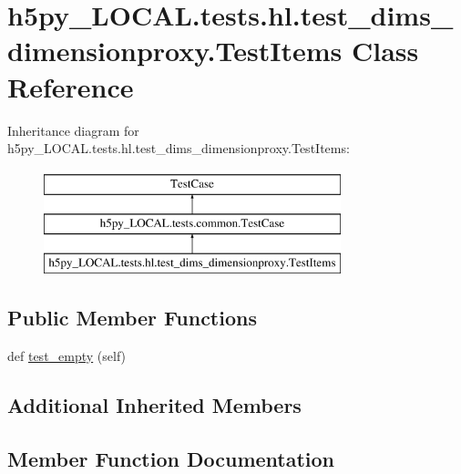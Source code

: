 \hypertarget{classh5py__LOCAL_1_1tests_1_1hl_1_1test__dims__dimensionproxy_1_1TestItems}{}\section{h5py\+\_\+\+L\+O\+C\+A\+L.\+tests.\+hl.\+test\+\_\+dims\+\_\+dimensionproxy.\+Test\+Items Class Reference}
\label{classh5py__LOCAL_1_1tests_1_1hl_1_1test__dims__dimensionproxy_1_1TestItems}
Inheritance diagram for h5py\+\_\+\+L\+O\+C\+A\+L.\+tests.\+hl.\+test\+\_\+dims\+\_\+dimensionproxy.\+Test\+Items\+:\begin{figure}[H]
\begin{center}
\leavevmode
\includegraphics[height=3.000000cm]{classh5py__LOCAL_1_1tests_1_1hl_1_1test__dims__dimensionproxy_1_1TestItems}
\end{center}
\end{figure}
\subsection*{Public Member Functions}
\begin{DoxyCompactItemize}
\item 
def \hyperlink{classh5py__LOCAL_1_1tests_1_1hl_1_1test__dims__dimensionproxy_1_1TestItems_ab36e31dd94cb781d712ef52baca29397}{test\+\_\+empty} (self)
\end{DoxyCompactItemize}
\subsection*{Additional Inherited Members}


\subsection{Member Function Documentation}
\mbox{\label{classh5py__LOCAL_1_1tests_1_1hl_1_1test__dims__dimensionproxy_1_1TestItems_ab36e31dd94cb781d712ef52baca29397}} 
